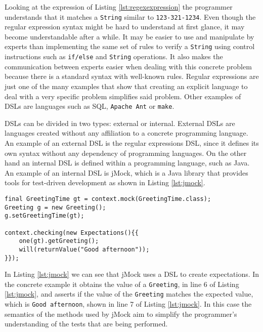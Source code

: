 \noindent
Looking at the expression of Listing \ref{lst:regexexpression} the programmer understands that it matches a \texttt{String} similar to \texttt{123-321-1234}. Even though the regular expression syntax might be hard to understand at first glance, it may become understandable after a while. It may be easier to use and manipulate by experts than implementing the same set of rules to verify a \texttt{String} using control instructions such as \texttt{if/else} and \texttt{String} operations. It also makes the communication between experts easier when dealing with this concrete problem because there is a standard syntax with well-known rules. Regular expressions are just one of the many examples that show that creating an explicit language to deal with a very specific problem simplifies said problem. Other examples of \ac{DSL}s are languages such as \ac{SQL}\cite{sql}, \texttt{Apache Ant}\cite{ant} or \texttt{make}\cite{make}. 

\noindent
\ac{DSL}s can be divided in two types: external or internal. External \ac{DSL}s are languages created without any affiliation to a concrete programming language. An example of an external \ac{DSL} is the regular expressions \ac{DSL}, since it defines its own syntax without any dependency of programming languages. On the other hand an internal \ac{DSL} is defined within a programming language, such as Java. An example of an internal \ac{DSL} is jMock\cite{jmock}, which is a Java library that provides tools for test-driven development as shown in Listing \ref{lst:jmock}. 

\bigskip


\begin{minipage}{\linewidth}
\begin{lstlisting}[caption={jMock Use Example}, label={lst:jmock}]
final GreetingTime gt = context.mock(GreetingTime.class);
Greeting g = new Greeting();
g.setGreetingTime(gt);

context.checking(new Expectations(){{
	one(gt).getGreeting(); 
	will(returnValue("Good afternoon"));
}});
\end{lstlisting}
\end{minipage} 

\noindent
In Listing \ref{lst:jmock} we can see that jMock uses a \ac{DSL} to create expectations. In the concrete example it obtains the value of a \texttt{Greeting}, in line 6 of Listing \ref{lst:jmock},  and asserts if the value of the \texttt{Greeting} matches the expected value, which is \texttt{Good afternoon}, shown in line 7 of Listing \ref{lst:jmock}. In this case the semantics of the methods used by jMock aim to simplify the programmer's understanding of the tests that are being performed.

